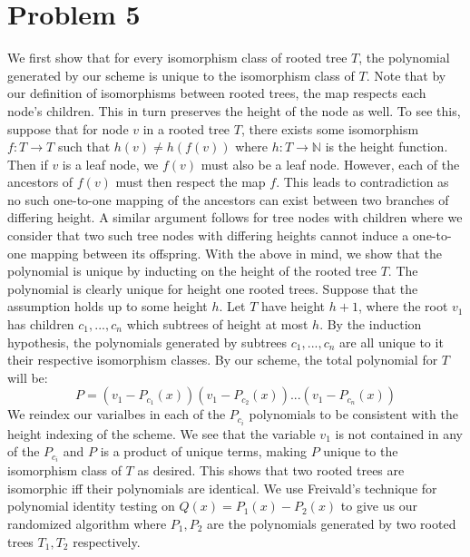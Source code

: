 \documentclass[12pt]{article}%
\begin{document}
\section*{Problem 5}
We first show that for every isomorphism class of rooted tree $T$, the polynomial generated by our scheme is unique to the isomorphism class of $T$. Note that by our definition of isomorphisms between rooted trees, the map respects each node's children. This in turn preserves the height of the node as well. To see this, suppose that for node $v$ in a rooted tree $T$, there exists some isomorphism $f: T \rightarrow T$ such that $h(v) \neq h(f(v))$ where $h: T \rightarrow \mathbb{N}$ is the height function. Then if $v$ is a leaf node, we $f(v)$ must also be a leaf node. However, each of the ancestors of $f(v)$ must then respect the map $f$. This leads to contradiction as no such one-to-one mapping of the ancestors can exist between two branches of differing height. A similar argument follows for tree nodes with children where we consider that two such tree nodes with differing heights cannot induce a one-to-one mapping between its offspring. \newline \newline
With the above in mind, we show that the polynomial is unique by inducting on the height of the rooted tree $T$. The polynomial is clearly unique for height one rooted trees. Suppose that the assumption holds up to some height $h$. Let $T$ have height $h+1$, where the root $v_1$ has children
$c_1,...,c_n$ which subtrees of height at most $h$. By the induction hypothesis, the polynomials generated by subtrees $c_1,...,c_n$ are all unique to it their respective isomorphism classes. By our scheme, the total polynomial for $T$ will be:
$$ P = (v_1 - P_{c_1}(x)) (v_1 - P_{c_2}(x))...(v_1 - P_{c_n}(x))$$ We reindex our varialbes in each of the $P_{c_i}$ polynomials to be consistent with the height indexing of the scheme.
We see that the variable $v_1$ is not contained in any of the $P_{c_i}$ and $P$ is a product of unique terms, making $P$ unique to the isomorphism class of $T$ as desired. This shows that two rooted trees are isomorphic iff their polynomials are identical. We use Freivald's technique for polynomial identity testing on $Q(x) = P_1(x) - P_2(x)$ to give us our randomized algorithm where $P_1,P_2$ are the polynomials generated by two rooted trees $T_1,T_2$ respectively.
\end{document}
